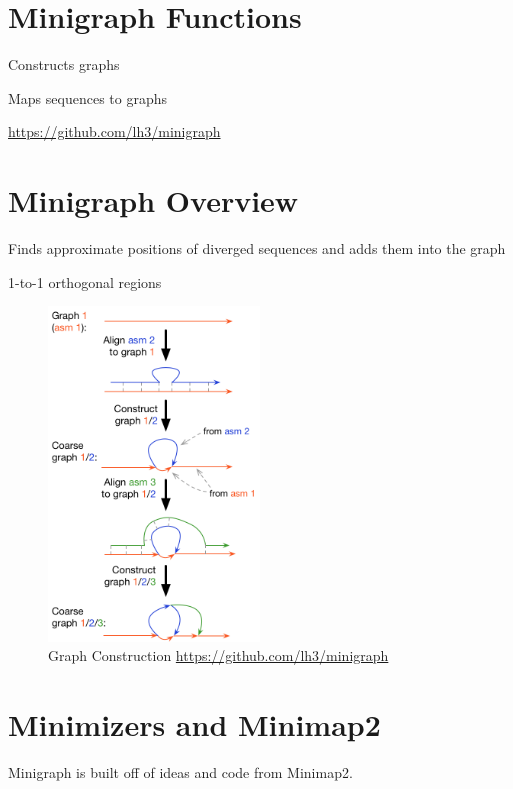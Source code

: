 \documentclass[
]{book}
\begin{document}
\hypertarget{minigraph-functions}{%
\section{Minigraph Functions}\label{minigraph-functions}}

Constructs graphs

Maps sequences to graphs

\url{https://github.com/lh3/minigraph}

\hypertarget{minigraph-overview}{%
\section{Minigraph Overview}\label{minigraph-overview}}

Finds approximate positions of diverged sequences and adds them into the graph

1-to-1 orthogonal regions

\begin{figure}
\centering
\includegraphics[width=0.5\textwidth,height=\textheight]{./Figures/Minigraph.png}
\caption{Graph Construction \url{https://github.com/lh3/minigraph}}
\end{figure}

\hypertarget{minimizers-and-minimap2}{%
\section{Minimizers and Minimap2}\label{minimizers-and-minimap2}}

Minigraph is built off of ideas and code from Minimap2.
\end{document}
